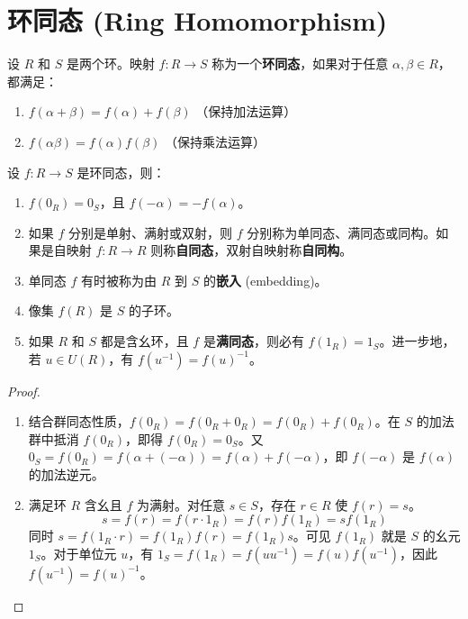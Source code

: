 \documentclass[11pt]{article}
\begin{document}
\section{环同态 (Ring Homomorphism)}

\begin{cndefinition}[环同态]
设 $R$ 和 $S$ 是两个环。映射 $f: R \to S$ 称为一个\textbf{环同态}，如果对于任意 $\alpha, \beta \in R$，都满足：
\begin{enumerate}
    \item $f(\alpha + \beta) = f(\alpha) + f(\beta)$ （保持加法运算）
    \item $f(\alpha\beta) = f(\alpha)f(\beta)$ （保持乘法运算）
\end{enumerate}
\end{cndefinition}

\begin{cnproperty}[环同态的基本性质]
设 $f: R \to S$ 是环同态，则：
\begin{enumerate}
    \item $f(0_R) = 0_S$，且 $f(-\alpha) = -f(\alpha)$。
    \item 如果 $f$ 分别是单射、满射或双射，则 $f$ 分别称为单同态、满同态或同构。如果是自映射 $f:R \to R$ 则称\textbf{自同态}，双射自映射称\textbf{自同构}。
    \item 单同态 $f$ 有时被称为由 $R$ 到 $S$ 的\textbf{嵌入} (embedding)。
    \item 像集 $f(R)$ 是 $S$ 的子环。
    \item 如果 $R$ 和 $S$ 都是含幺环，且 $f$ 是\textbf{满同态}，则必有 $f(1_R) = 1_S$。进一步地，若 $u \in U(R)$，有 $f(u^{-1}) = f(u)^{-1}$。
\end{enumerate}
\end{cnproperty}
\begin{proof}
\begin{enumerate}
    \item 结合群同态性质，$f(0_R) = f(0_R + 0_R) = f(0_R) + f(0_R)$。在 $S$ 的加法群中抵消 $f(0_R)$，即得 $f(0_R) = 0_S$。又 $0_S = f(0_R) = f(\alpha + (-\alpha)) = f(\alpha) + f(-\alpha)$，即 $f(-\alpha)$ 是 $f(\alpha)$ 的加法逆元。
    \item 满足环 $R$ 含幺且 $f$ 为满射。对任意 $s \in S$，存在 $r \in R$ 使 $f(r) = s$。
    $$s = f(r) = f(r \cdot 1_R) = f(r)f(1_R) = s f(1_R)$$
    同时 $s = f(1_R \cdot r) = f(1_R)f(r) = f(1_R) s$。可见 $f(1_R)$ 就是 $S$ 的幺元 $1_S$。对于单位元 $u$，有 $1_S = f(1_R) = f(uu^{-1}) = f(u)f(u^{-1})$，因此 $f(u^{-1}) = f(u)^{-1}$。
\end{enumerate}
\end{proof}
\end{document}
